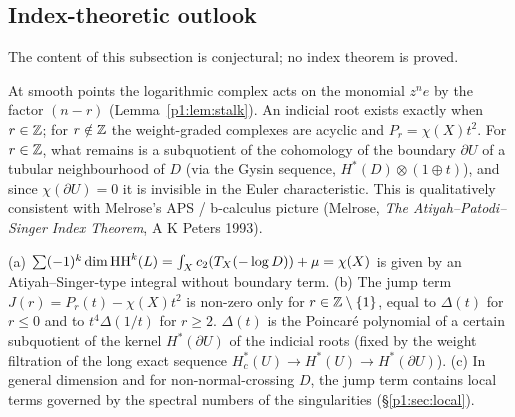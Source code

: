 \subsection{Index-theoretic outlook}\label{p1:sec:index}
The content of this subsection is conjectural; no index theorem is proved.
\begin{obs}
At smooth points the logarithmic complex acts on the monomial $z^ne$ by the factor $(n-r)$ (Lemma~\ref{p1:lem:stalk}). An indicial root exists exactly when $r\in\mathbb Z$; for $r\notin\mathbb Z$ the weight-graded complexes are acyclic and $P_r=\chi(X)t^2$. For $r\in\mathbb Z$, what remains is a subquotient of the cohomology of the boundary $\partial U$ of a tubular neighbourhood of $D$ (via the Gysin sequence, $H^*(D)\otimes(1\oplus t)$), and since $\chi(\partial U)=0$ it is invisible in the Euler characteristic. This is qualitatively consistent with Melrose's APS / b-calculus picture (Melrose, \emph{The Atiyah--Patodi--Singer Index Theorem}, A K Peters 1993).
\end{obs}
\begin{conj}\tK\label{p1:conj:I3}
(a) $\sum(-1)^k\dim\mathrm{HH}^k(L)=\int_Xc_2(T_X(-\log D))+\mu=\chi(X)$ is given by an Atiyah--Singer-type integral without boundary term. (b) The jump term $J(r)=P_r(t)-\chi(X)t^2$ is non-zero only for $r\in\mathbb Z\setminus\{1\}$, equal to $\Delta(t)$ for $r\le0$ and to $t^4\Delta(1/t)$ for $r\ge2$. $\Delta(t)$ is the Poincar\'e polynomial of a certain subquotient of the kernel $H^*(\partial U)$ of the indicial roots (fixed by the weight filtration of the long exact sequence $H_c^*(U)\to H^*(U)\to H^*(\partial U)$). (c) In general dimension and for non-normal-crossing $D$, the jump term contains local terms governed by the spectral numbers of the singularities (\S\ref{p1:sec:local}).
\end{conj}
